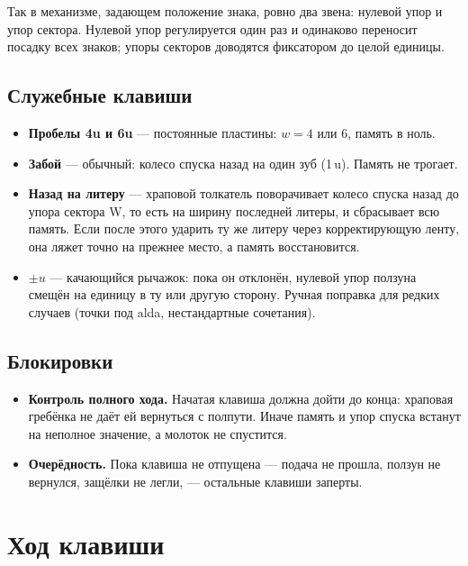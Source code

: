Так в механизме, задающем положение знака, ровно два звена: нулевой упор и упор сектора. Нулевой упор регулируется один раз и одинаково переносит посадку всех знаков; упоры секторов доводятся фиксатором до целой единицы.

\subsection{Служебные клавиши}

\begin{itemize}
  \item \textbf{Пробелы 4u и 6u} — постоянные пластины: $w = 4$ или $6$, память в ноль.
  \item \textbf{Забой} — обычный: колесо спуска назад на один зуб (1\,u). Память не трогает.
  \item \textbf{Назад на литеру} — храповой толкатель поворачивает колесо спуска назад до упора сектора W, то есть на ширину последней литеры, и сбрасывает всю память. Если после этого ударить ту же литеру через корректирующую ленту, она ляжет точно на прежнее место, а память восстановится.
  \item \textbf{$\pm u$} — качающийся рычажок: пока он отклонён, нулевой упор ползуна смещён на единицу в ту или другую сторону. Ручная поправка для редких случаев (точки под alda, нестандартные сочетания).
\end{itemize}

\subsection{Блокировки}

\begin{itemize}
  \item \textbf{Контроль полного хода.} Начатая клавиша должна дойти до конца: храповая гребёнка не даёт ей вернуться с полпути. Иначе память и упор спуска встанут на неполное значение, а молоток не спустится.
  \item \textbf{Очерёдность.} Пока клавиша не отпущена — подача не прошла, ползун не вернулся, защёлки не легли, — остальные клавиши заперты.
\end{itemize}

\section{Ход клавиши}

